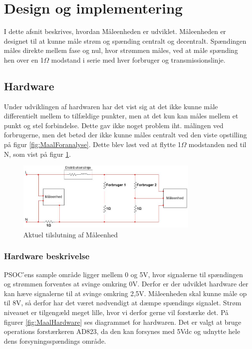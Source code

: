 
\section{Design og implementering}
I dette afsnit beskrives, hvordan Måleenheden er udviklet. Måleenheden er designet til at kunne måle strøm og spænding centralt og decentralt. Spændingen måles direkte mellem fase og nul, hvor strømmen måles, ved at måle spænding hen over en 1$\Omega$ modstand i serie med hver forbruger og transmissionslinje. 

\subsection{Hardware}

Under udviklingen af hardwaren har det vist sig at det ikke kunne måle differentielt mellem to tilfældige punkter, men at det kun kan måles mellem et punkt og stel forbindelse. Dette gav ikke noget problem iht. målingen ved forbrugerne, men det betød der ikke kunne måles centralt ved den viste opstilling på figur \ref{fig:MaalForanalyse}. Dette blev løst ved at flytte 1$\Omega$ modstanden ned til N, som vist på figur \ref{fig:MaalAktuel}.

\begin{figure}[H] %
	\centering
	\includegraphics[width=0.8\textwidth]{figure/MaalAktuel}
	\caption{Aktuel tilslutning af Måleenhed}
	\label{fig:MaalAktuel}
\end{figure} 


\subsubsection{Hardware beskrivelse}
PSOC'ens sample område ligger mellem 0 og 5V, hvor signalerne til spændingen og strømmen forventes at svinge omkring 0V. Derfor er der udviklet hardware der kan hæve signalerne til at svinge omkring 2,5V. Måleenheden skal kunne måle op til 8V, så derfor har det været nødvendigt at dæmpe spændings signalet. Strøm niveauet er tilgengæld meget lille, hvor vi derfor gerne vil forstærke det. På figurer \ref{fig:MaalHardware} ses diagrammet for hardwaren. Det er valgt at bruge operations forstærkeren AD823, da den kan forsynes med 5Vdc og udnytte hele dens forsyningsspændings område.  
  

